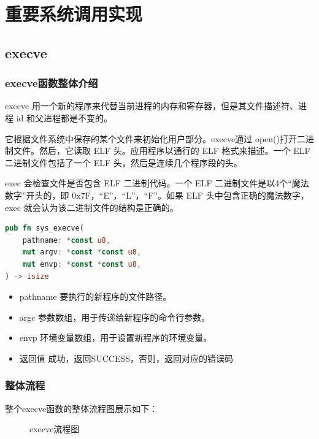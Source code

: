 \section{重要系统调用实现}
\subsection{execve}
\subsubsection{execve函数整体介绍}
execve 用一个新的程序来代替当前进程的内存和寄存器，但是其文件描述符、进程 id 和父进程都是不变的。

它根据文件系统中保存的某个文件来初始化用户部分。execve通过 open()打开二进制文件。然后，它读取 ELF 头。应用程序以通行的 ELF 格式来描述。一个 ELF 二进制文件包括了一个 ELF 头，然后是连续几个程序段的头。

exec 会检查文件是否包含 ELF 二进制代码。一个 ELF 二进制文件是以4个“魔法数字”开头的，即 0x7F，“E”，“L”，“F”。如果 ELF 头中包含正确的魔法数字， exec  就会认为该二进制文件的结构是正确的。
\begin{lstlisting}[language={Rust}, 
    caption={execve输入参数与返回值}]
pub fn sys_execve(
    pathname: *const u8,
    mut argv: *const *const u8,
    mut envp: *const *const u8,
) -> isize
\end{lstlisting}
\begin{itemize}
    \item pathname 要执行的新程序的文件路径。
    \item argc 参数数组，用于传递给新程序的命令行参数。
    \item envp 环境变量数组，用于设置新程序的环境变量。
    \item 返回值 成功，返回SUCCESS，否则，返回对应的错误码
\end{itemize}
\subsubsection{整体流程}
整个execve函数的整体流程图展示如下：
\begin{figure}[H]
    \centering
    \caption{execve流程图}
\end{figure}

